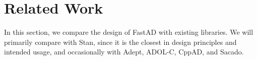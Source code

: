 \section{Related Work}\label{sec:related}

In this section, we compare the design of FastAD with existing libraries.
We will primarily compare with Stan, since it is the closest in design principles
and intended usage, and occasionally with Adept, ADOL-C, CppAD, and Sacado.






